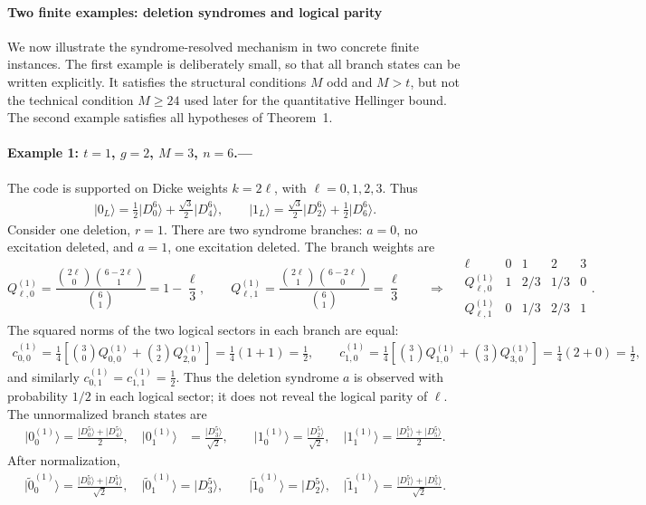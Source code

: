 \documentclass[aps,prl,reprint,superscriptaddress,nofootinbib]{revtex4-2}
\newcommand{\ket}[1]{\lvert #1\rangle}
\begin{document}
\paragraph{Two finite examples: deletion syndromes and logical parity}

We now illustrate the syndrome-resolved mechanism in two concrete finite
instances.  The first example is deliberately small, so that all branch
states can be written explicitly.  It satisfies the structural conditions
$M$ odd and $M>t$, but not the technical condition $M\ge24$ used later for
the quantitative Hellinger bound.  The second example satisfies all
hypotheses of Theorem~1.

\paragraph*{Example 1: $t=1$, $g=2$, $M=3$, $n=6$.---}
The code is supported on Dicke weights $k=2\ell$, with
$\ell=0,1,2,3$.  Thus
\begin{align}
\ket{0_L}=
\frac{1}{2}\ket{D_0^6}
+
\frac{\sqrt3}{2}\ket{D_4^6},
\qquad
\ket{1_L}=
\frac{\sqrt3}{2}\ket{D_2^6}
+
\frac{1}{2}\ket{D_6^6}.
\end{align}
Consider one deletion, $r=1$.  There are two syndrome branches:
$a=0$, no excitation deleted, and $a=1$, one excitation deleted.  The branch
weights are
\begin{equation}
Q_{\ell,0}^{(1)}
=
\frac{\binom{2\ell}{0}\binom{6-2\ell}{1}}{\binom61}
=
1-\frac{\ell}{3},
\qquad
Q_{\ell,1}^{(1)}
=
\frac{\binom{2\ell}{1}\binom{6-2\ell}{0}}{\binom61}
=
\frac{\ell}{3}
\qquad\Longrightarrow\quad
\begin{array}{c|cccc}
\ell & 0 & 1 & 2 & 3 \\ \hline
Q_{\ell,0}^{(1)} & 1 & 2/3 & 1/3 & 0 \\
Q_{\ell,1}^{(1)} & 0 & 1/3 & 2/3 & 1
\end{array}.
\end{equation}
The squared norms of the two logical sectors in each branch are equal:
\begin{align}
c_{0,0}^{(1)}
=
\frac14\left[
\binom30 Q_{0,0}^{(1)}
+
\binom32 Q_{2,0}^{(1)}
\right]
=
\frac14(1+1)
=
\frac12,
\qquad
c_{1,0}^{(1)}
=
\frac14\left[
\binom31 Q_{1,0}^{(1)}
+
\binom33 Q_{3,0}^{(1)}
\right]
=
\frac14(2+0)
=
\frac12,
\end{align}
and similarly 
$c_{0,1}^{(1)}=c_{1,1}^{(1)}=\frac12$.
Thus the deletion syndrome $a$ is observed with probability $1/2$ in each
logical sector; it does not reveal the logical parity of $\ell$.
%
The unnormalized branch states are
\begin{align}
\ket{0_0^{(1)}}=
\frac{\ket{D_0^5}+\ket{D_4^5}}2,
\quad
\ket{0_1^{(1)}}&=
\frac{\ket{D_3^5}}{\sqrt2},
\qquad
\ket{1_0^{(1)}}=
\frac{\ket{D_2^5}}{\sqrt2},
\quad
\ket{1_1^{(1)}}=
\frac{\ket{D_1^5}+\ket{D_5^5}}2.
\end{align}
After normalization,
\begin{align}
\ket{\widetilde0_0^{(1)}}=
\frac{\ket{D_0^5}+\ket{D_4^5}}{\sqrt2},
\quad
\ket{\widetilde0_1^{(1)}}=\ket{D_3^5},
\qquad
\ket{\widetilde1_0^{(1)}}=\ket{D_2^5},
\quad
\ket{\widetilde1_1^{(1)}}=
\frac{\ket{D_1^5}+\ket{D_5^5}}{\sqrt2}.
\end{align}
\end{document}

